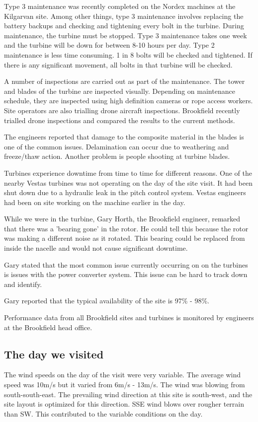 \documentclass[12pt]{article} %
\begin{document}
Type 3 maintenance was recently completed on the Nordex machines at the Kilgarvan site. Among other things, type 3 maintenance involves replacing the battery backups and checking and tightening every bolt in the turbine. During maintenance, the turbine must be stopped. Type 3 maintenance takes one week and the turbine will be down for between 8-10 hours per day.
Type 2 maintenance is less time consuming. 1 in 8 bolts will be checked and tightened. If there is any significant movement, all bolts in that turbine will be checked.

A number of inspections are carried out as part of the maintenance. The tower and blades of the turbine are inspected visually. Depending on maintenance schedule, they are inspected using high definition cameras or rope access workers. Site operators are also trialling drone aircraft inspections. Brookfield recently trialled drone inspections and compared the results to the current methods.

The engineers reported that damage to the composite material in the blades is one of the common issues. Delamination can occur due to weathering and freeze/thaw action. Another problem is people shooting at turbine blades.

Turbines experience downtime from time to time for different reasons. One of the nearby Vestas turbines was not operating on the day of the site visit. It had been shut down due to a hydraulic leak in the pitch control system. Vestas engineers had been on site working on the machine earlier in the day.

While we were in the turbine, Gary Horth, the Brookfield engineer, remarked that there was a 'bearing gone' in the rotor. He could tell this because the rotor was making a different noise as it rotated. This bearing could be replaced from inside the nacelle and would not cause significant downtime.

Gary stated that the most common issue currently occurring on on the turbines is issues with the power converter system. This issue can be hard to track down and identify.

Gary reported that the typical availability of the site is 97\% - 98\%.

Performance data from all Brookfield sites and turbines is monitored by engineers at the Brookfield head office.

\subsection{The day we visited}
The wind speeds on the day of the visit were very variable. The average wind speed was 10m/s but it varied from 6m/s - 13m/s. 
The wind was blowing from south-south-east. The prevailing wind direction at this site is south-west, and the site layout is optimized for this direction.
SSE wind blows over rougher terrain than SW. This contributed to the variable conditions on the day.
\end{document}
